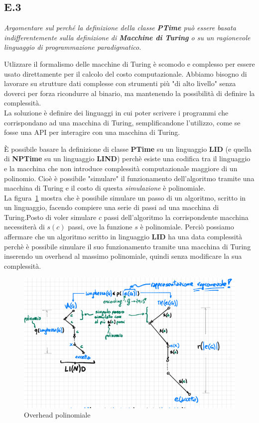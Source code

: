 \documentclass[a4paper]{article}
\begin{document}
\subsection{E.3}
\emph{Argomentare sul perché la definizione della classe \textbf{PTime} può essere basata indifferentemente sulla definizione di \textbf{Macchine di Turing} o su un ragionevole linguaggio di programmazione paradigmatico.}


Utlizzare il formalismo delle macchine di Turing è scomodo e complesso per essere usato direttamente per il calcolo del costo computazionale.
Abbiamo bisogno di lavorare su strutture dati complesse con strumenti più "di alto livello" senza doverci per forza ricondurre al binario, ma mantenendo la possibilità di definire la complessità.\\
La soluzione è definire dei linguaggi in cui poter scrivere i programmi che corrispondano ad una macchina di Turing, semplificandone l'utilizzo, come se fosse una API per interagire con una macchina di Turing.

È possibile basare la definizione di classe \textbf{PTime} su un linguaggio \textbf{LID} (e quella di \textbf{NPTime} su un linguaggio \textbf{LIND}) perchè esiste una codifica tra il linguaggio e la macchina che non introduce complessità computazionale maggiore di un polinomio.
Cioè è possibile "simulare" il funzionamento dell'algoritmo tramite una macchina di Turing e il costo di questa \textit{simulazione} è polinomiale.\\
La figura~\ref{FIG:E3} mostra che è possibile simulare un passo di un algoritmo, scritto in un linguaggio, facendo compiere una serie di passi ad una macchina di Turing.Posto di voler simulare $c$ passi dell'algoritmo la corrispondente macchina necessiterà di $s(c)$ passi, ove la funzione $s$ è polinomiale.
Perciò possiamo affermare che un algoritmo scritto in linguaggio \textbf{LID} ha una data complessità perchè è possibile simulare il suo funzionamento tramite una macchina di Turing inserendo un overhead al massimo polinomiale, quindi senza modificare la sua complessità.
\begin{figure}[!ht]
\centering
\includegraphics[width = 1\textwidth]{./img/E3.png}
\caption{Overhead polinomiale} \label{FIG:E3}
\end{figure}\\
\end{document}

